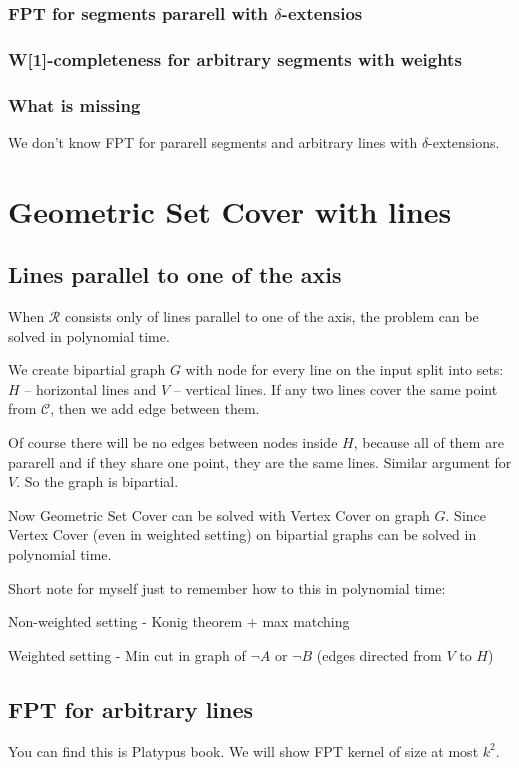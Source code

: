 \documentclass[en]{pracamgr}
\begin{document}
\subsection{FPT for segments pararell with $\delta$-extensios}
\subsection{W[1]-completeness for arbitrary segments with weights}
\subsection{What is missing}
We don't know FPT for pararell segments
and arbitrary lines with $\delta$-extensions.

\chapter{Geometric Set Cover with lines}
\section{Lines parallel to one of the axis}
When $\mathcal{R}$ consists only of lines parallel to
one of the axis, the problem can be solved in
polynomial time.

We create bipartial graph $G$ with node for every line on the input
split into sets: $H$ -- horizontal lines and $V$ -- vertical lines.
If any two lines cover the same point from $\mathcal{C}$, then
we add edge between them.

Of course there will be no edges between nodes inside $H$,
because all of them are pararell and if they share 
one point, they are the same lines. Similar argument for $V$.
So the graph is bipartial.

Now Geometric Set Cover can be solved with Vertex Cover on graph $G$.
Since Vertex Cover (even in weighted setting) 
on bipartial graphs can be solved in polynomial time.

Short note for myself just to remember how to this in polynomial time:

Non-weighted setting - Konig theorem + max matching

Weighted setting - Min cut in graph of $\neg A$ or $\neg B$
(edges directed from $V$ to $H$)

\section{FPT for arbitrary lines}
You can find this is Platypus book.
We will show FPT kernel of size at most $k^2$.
\end{document}
